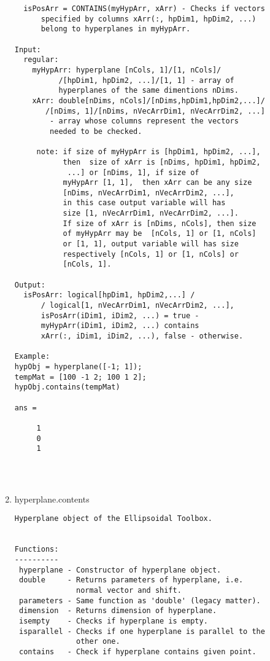 \begin{enumerate}
\begin{lstlisting}
  isPosArr = CONTAINS(myHypArr, xArr) - Checks if vectors
      specified by columns xArr(:, hpDim1, hpDim2, ...)
      belong to hyperplanes in myHypArr.

Input:
  regular:
    myHypArr: hyperplane [nCols, 1]/[1, nCols]/
          /[hpDim1, hpDim2, ...]/[1, 1] - array of
          hyperplanes of the same dimentions nDims.
    xArr: double[nDims, nCols]/[nDims,hpDim1,hpDim2,...]/
       /[nDims, 1]/[nDims, nVecArrDim1, nVecArrDim2, ...]
        - array whose columns represent the vectors
        needed to be checked.

     note: if size of myHypArr is [hpDim1, hpDim2, ...],
           then  size of xArr is [nDims, hpDim1, hpDim2,
            ...] or [nDims, 1], if size of
           myHypArr [1, 1],  then xArr can be any size
           [nDims, nVecArrDim1, nVecArrDim2, ...],
           in this case output variable will has
           size [1, nVecArrDim1, nVecArrDim2, ...].
           If size of xArr is [nDims, nCols], then size
           of myHypArr may be  [nCols, 1] or [1, nCols]
           or [1, 1], output variable will has size
           respectively [nCols, 1] or [1, nCols] or
           [nCols, 1].

Output:
  isPosArr: logical[hpDim1, hpDim2,...] /
      / logical[1, nVecArrDim1, nVecArrDim2, ...],
      isPosArr(iDim1, iDim2, ...) = true -
      myHypArr(iDim1, iDim2, ...) contains
      xArr(:, iDim1, iDim2, ...), false - otherwise.

Example:
hypObj = hyperplane([-1; 1]);
tempMat = [100 -1 2; 100 1 2];
hypObj.contains(tempMat)

ans =

     1
     0
     1




\end{lstlisting}
\fontfamily{\familydefault}
\selectfont
\item {hyperplane.contents}
\selectfont
\begin{lstlisting}
Hyperplane object of the Ellipsoidal Toolbox.


Functions:
----------
 hyperplane - Constructor of hyperplane object.
 double     - Returns parameters of hyperplane, i.e.
              normal vector and shift.
 parameters - Same function as 'double' (legacy matter).
 dimension  - Returns dimension of hyperplane.
 isempty    - Checks if hyperplane is empty.
 isparallel - Checks if one hyperplane is parallel to the
              other one.
 contains   - Check if hyperplane contains given point.



\end{lstlisting}
\end{enumerate}
